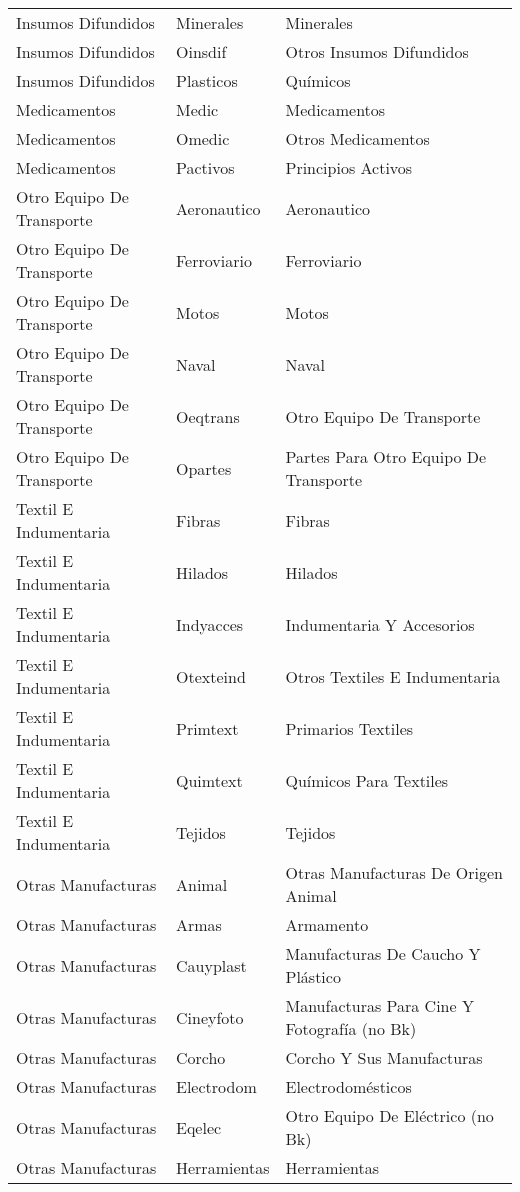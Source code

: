 \documentclass[class=article, crop=false]{standalone}
\begin{document}
\begin{longtable}[!ht]{lll}
	Insumos Difundidos & Minerales & Minerales \\
	Insumos Difundidos & Oinsdif & Otros Insumos Difundidos \\
	Insumos Difundidos & Plasticos & Químicos \\
	Medicamentos & Medic & Medicamentos \\
	Medicamentos & Omedic & Otros Medicamentos \\
	Medicamentos & Pactivos & Principios Activos \\
	Otro Equipo De Transporte & Aeronautico & Aeronautico \\
	Otro Equipo De Transporte & Ferroviario & Ferroviario \\
	Otro Equipo De Transporte & Motos & Motos \\
	Otro Equipo De Transporte & Naval & Naval \\
	Otro Equipo De Transporte & Oeqtrans & Otro Equipo De Transporte \\
	Otro Equipo De Transporte & Opartes & Partes Para Otro Equipo De Transporte \\
	Textil E Indumentaria & Fibras & Fibras \\
	Textil E Indumentaria & Hilados & Hilados \\
	Textil E Indumentaria & Indyacces & Indumentaria Y Accesorios \\
	Textil E Indumentaria & Otexteind & Otros Textiles E Indumentaria \\
	Textil E Indumentaria & Primtext & Primarios Textiles \\
	Textil E Indumentaria & Quimtext & Químicos Para Textiles \\
	Textil E Indumentaria & Tejidos & Tejidos \\
	Otras Manufacturas & Animal & Otras Manufacturas De Origen Animal \\
	Otras Manufacturas & Armas & Armamento \\
	Otras Manufacturas & Cauyplast & Manufacturas De Caucho Y Plástico \\
	Otras Manufacturas & Cineyfoto & Manufacturas Para Cine Y Fotografía (no Bk) \\
	Otras Manufacturas & Corcho & Corcho Y Sus Manufacturas \\
	Otras Manufacturas & Electrodom & Electrodomésticos \\
	Otras Manufacturas & Eqelec & Otro Equipo De Eléctrico (no Bk) \\
	Otras Manufacturas & Herramientas & Herramientas \\

\end{longtable}
\end{document}
